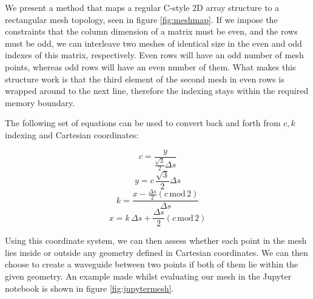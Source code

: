 \documentclass{article}
\begin{document}
We present a method that maps a regular C-style 2D array structure
to a rectangular mesh topology, seen in figure \ref{fig:meshmap}.
If we impose the constraints that the column dimension of a matrix
must be even, and the rows must be odd, we can interleave two meshes
of identical size in the even and odd indexes of this matrix, respectively.
Even rows will have an odd number of mesh points, whereas odd rows
will have an even number of them. What makes this structure work
is that the third element of the second mesh in even rows is
wrapped around to the next line, therefore the indexing stays
within the required memory boundary.

The following set of equations can be used to convert back and forth
from \(c, k\) indexing and Cartesian coordinates:

\begin{equation}
    c = \frac{y}{\frac{\sqrt{3}}{2} \Delta s}
\end{equation}
\begin{equation}
    y = c\,\frac{\sqrt{3}}{2} \Delta s
\end{equation}
\begin{equation}
    k = \frac{x - \frac{\Delta s}{2} (c\,\mbox{mod}\,2)}{\Delta s}
\end{equation}
\begin{equation}
    x = k\,\Delta s + \frac{\Delta s}{2} (c\,\mbox{mod}\,2)
\end{equation}

Using this coordinate system, we can then assess whether each point
in the mesh lies inside or outside any geometry defined in
Cartesian coordinates. We can then choose to create a waveguide
between two points if both of them lie within the given geometry.
An example made whilst evaluating our mesh in the Jupyter notebook
is shown in figure \ref{fig:jupytermesh}.
\end{document}
